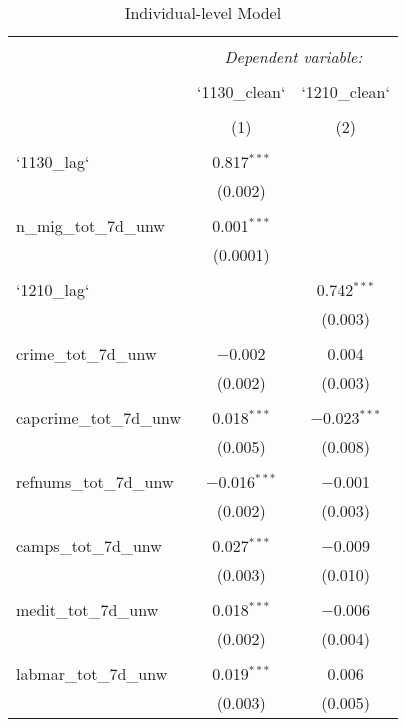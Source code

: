 
\begin{table}[!htbp] \centering 
  \caption{Individual-level Model} 
  \label{} 
\begin{tabular}{@{\extracolsep{5pt}}lcc} 
\\[-1.8ex]\hline 
\hline \\[-1.8ex] 
 & \multicolumn{2}{c}{\textit{Dependent variable:}} \\ 
\cline{2-3} 
\\[-1.8ex] & `1130\_clean` & `1210\_clean` \\ 
\\[-1.8ex] & (1) & (2)\\ 
\hline \\[-1.8ex] 
 `1130\_lag` & 0.817$^{***}$ &  \\ 
  & (0.002) &  \\ 
  & & \\ 
 n\_mig\_tot\_7d\_unw & 0.001$^{***}$ &  \\ 
  & (0.0001) &  \\ 
  & & \\ 
 `1210\_lag` &  & 0.742$^{***}$ \\ 
  &  & (0.003) \\ 
  & & \\ 
 crime\_tot\_7d\_unw & $-$0.002 & 0.004 \\ 
  & (0.002) & (0.003) \\ 
  & & \\ 
 capcrime\_tot\_7d\_unw & 0.018$^{***}$ & $-$0.023$^{***}$ \\ 
  & (0.005) & (0.008) \\ 
  & & \\ 
 refnums\_tot\_7d\_unw & $-$0.016$^{***}$ & $-$0.001 \\ 
  & (0.002) & (0.003) \\ 
  & & \\ 
 camps\_tot\_7d\_unw & 0.027$^{***}$ & $-$0.009 \\ 
  & (0.003) & (0.010) \\ 
  & & \\ 
 medit\_tot\_7d\_unw & 0.018$^{***}$ & $-$0.006 \\ 
  & (0.002) & (0.004) \\ 
  & & \\ 
 labmar\_tot\_7d\_unw & 0.019$^{***}$ & 0.006 \\ 
  & (0.003) & (0.005) \\ 

\end{tabular}
\end{table}
